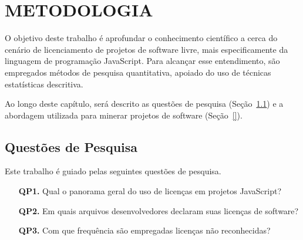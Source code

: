 
\chapter{METODOLOGIA}
\label{chap:metodologia}


O objetivo deste trabalho é  aprofundar o conhecimento científico a cerca do cenário de licenciamento de projetos de software livre, mais especificamente da linguagem de programação JavaScript.
Para alcançar esse entendimento, são empregados métodos de pesquisa quantitativa, apoiado do uso de técnicas estatísticas descritiva.

Ao longo deste capítulo, será descrito as questões de pesquisa (Seção~\ref{sec:qps}) e a abordagem utilizada para minerar projetos de software (Seção~\ref{}).

\section{Questões de Pesquisa}\label{sec:qps}

Este trabalho é guiado pelas seguintes questões de pesquisa.

\begin{itemize}
    \item[\textbf{QP1.}] Qual o panorama geral do uso de licenças em projetos JavaScript?
\end{itemize}


\begin{itemize}
    \item[\textbf{QP2.}] Em quais arquivos desenvolvedores declaram suas licenças de software?
\end{itemize}


\begin{itemize}
    \item[\textbf{QP3.}] Com que frequência são empregadas licenças não reconhecidas? 
\end{itemize}

